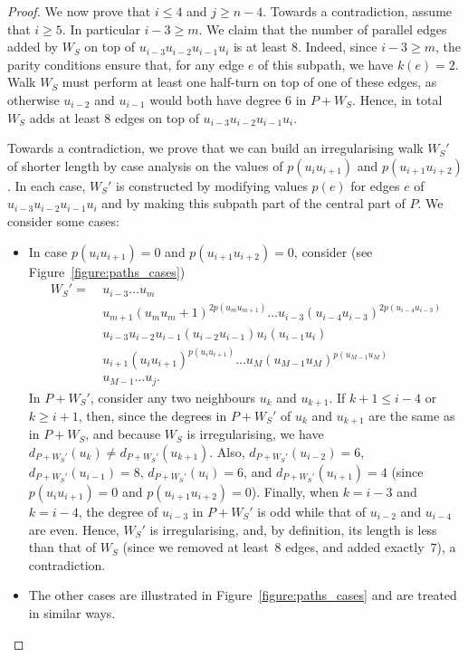 \documentclass[a4paper,11pt,dvipsnames]{elsarticle}
\begin{document}
\begin{proof}
We now prove that $i\le 4$ and $j\ge n-4$. Towards a contradiction, assume that $i\ge 5$. In particular $i-3\ge m$. We claim that the number of parallel edges added
by $W_S$ on top of $u_{i-3}u_{i-2}u_{i-1}u_i$ is at least $8$.
Indeed, since $i-3\ge m$, the parity conditions ensure that, for any edge $e$ of this subpath, we have $k(e)=2$.
Walk $W_S$ must perform at least one half-turn on top of one of these edges, as otherwise $u_{i-2}$ and $u_{i-1}$ would
both have degree $6$ in $P+W_S$. Hence, in total $W_S$ adds at least $8$ edges
on top of $u_{i-3}u_{i-2}u_{i-1}u_i$.

Towards a contradiction, we prove that we can build an irregularising walk $W_S'$ of shorter length
by case analysis on the values of $p(u_iu_{i+1})$ and  $p(u_{i+1}u_{i+2})$. In each
case, $W_S'$ is constructed by modifying values $p(e)$ for edges $e$ of $u_{i-3}u_{i-2}u_{i-1}u_i$
and by making this subpath part of the central part of $P$. We consider some cases:
\begin{itemize}
    \item In case $p(u_i u_{i+1})=0$ and $p(u_{i+1}u_{i+2})=0$, consider (see Figure~\ref{figure:paths_cases})
    \begin{align*}
    W_S'=~&u_{i-3}\dots u_m\\
    &u_{m+1}(u_mu_m+1)^{2p(u_mu_{m+1})}\dots u_{i-3}(u_{i-4}u_{i-3})^{2p(u_{i-4}u_{i-3})}\\
    &u_{i-3}u_{i-2}u_{i-1}(u_{i-2}u_{i-1})u_i(u_{i-1}u_i)\\
    &u_{i+1}(u_i u_{i+1})^{p(u_i u_{i+1})}\dots u_{M}(u_{M-1}u_{M})^{p(u_{M-1}u_M)}\\
    &u_{M-1}\dots u_j.
    \end{align*}
    In $P+W_S'$, consider any two neighbours $u_k$ and $u_{k+1}$. If $k+1\le i-4$ or $k\ge i+1$, then, since the degrees in $P+W_S'$ of $u_k$ and $u_{k+1}$ are the same as in $P+W_S$,
    and because $W_S$ is irregularising, we have $d_{P+W_S'}(u_k)\neq d_{P+W_S'}(u_{k+1})$. Also, $d_{P+W_S'}(u_{i-2})=6$, $d_{P+W_S'}(u_{i-1})=8$, $d_{P+W_S'}(u_i)=6$, and $d_{P+W_S'}(u_{i+1})=4$ (since $p(u_i u_{i+1})=0$ and $p(u_{i+1}u_{i+2})=0$).
    Finally, when $k=i-3$ and $k=i-4$, the degree of $u_{i-3}$ in $P+W_S'$ is odd
    while that of $u_{i-2}$ and $u_{i-4}$ are even. Hence, $W_S'$ is irregularising, and, by definition, its length is less than that of $W_S$ (since we removed at least~$8$ edges, and added exactly~$7$), a contradiction.
    
    \item The other cases are illustrated in Figure~\ref{figure:paths_cases} and are treated in similar ways.
\end{itemize}


\end{proof}
\end{document}
